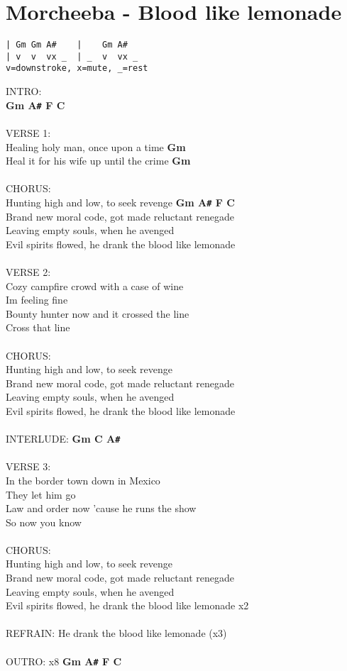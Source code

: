 \section{Morcheeba - Blood like lemonade}
\begin{verbatim}
| Gm Gm A#    |    Gm A#
| v  v  vx _  | _  v  vx _  
v=downstroke, x=mute, _=rest
\end{verbatim}
INTRO:\\
\textbf{Gm A\texttt{\#} F C}\\
\\
VERSE 1:\\
Healing holy man, once upon a time \textbf{Gm}\\
Heal it for his wife up until the crime \textbf{Gm}\\
\\
CHORUS:\\
Hunting high and low, to seek revenge \textbf{Gm A\texttt{\#} F C}\\
Brand new moral code, got made reluctant renegade\\
Leaving empty souls, when he avenged\\
Evil spirits flowed, he drank the blood like lemonade\\
\\
VERSE 2:\\
Cozy campfire crowd with a case of wine\\
Im feeling fine\\
Bounty hunter now and it crossed the line\\
Cross that line\\
\\
CHORUS:\\
Hunting high and low, to seek revenge\\
Brand new moral code, got made reluctant renegade\\
Leaving empty souls, when he avenged\\
Evil spirits flowed, he drank the blood like lemonade\\
\\
INTERLUDE: \textbf{Gm C A\texttt{\#}}\\
\\
VERSE 3:\\
In the border town down in Mexico\\
They let him go\\
Law and order now 'cause he runs the show\\
So now you know\\
\\
CHORUS:\\
Hunting high and low, to seek revenge\\
Brand new moral code, got made reluctant renegade\\
Leaving empty souls, when he avenged\\
Evil spirits flowed, he drank the blood like lemonade x2\\
\\
REFRAIN: He drank the blood like lemonade (x3)\\
\\
OUTRO: x8 \textbf{Gm A\texttt{\#} F C}\\
\newpage


